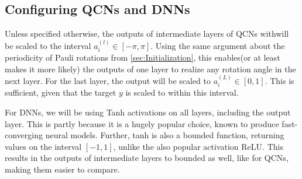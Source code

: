 \subsection{Configuring QCNs and DNNs}\label{sec:Configuring QCNs and DNNs}
Unless specified otherwise, the outputs of intermediate layers of QCNs withwill be scaled to the interval $a_i^{(l)} \in [-\pi, \pi]$. Using the same argument about the periodicity of Pauli rotations from \autoref{sec:Initialization}, this enables(or at least makes it more likely) the outputs of one layer to realize any rotation angle in the next layer. For the last layer, the output will be scaled to $a_i^{(L)} \in [0, 1]$. This is sufficient, given that the target $y$ is scaled to within this interval. 

For DNNs, we will be using Tanh activations on all layers, including the output layer. This is partly because it is a hugely popular choice, known to produce fast-converging neural models\cite{hands-on}. Further, tanh is also a bounded function, returning values on the interval $[-1, 1]$, unlike the also popular activation ReLU. This results in the outputs of intermediate layers to bounded as well, like for QCNs, making them easier to compare.





















